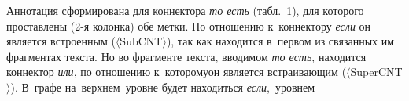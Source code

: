 \begin{multicols}{2}
Аннотация сформирована для коннектора \textit{то есть} (табл.~1), для которого 
проставлены (2-я колонка) обе метки. По отношению к~коннектору \textit{если} он 
является встроенным ($\langle$SubCNT$\rangle$), так как находится в~первом из 
связанных им фраг\-мен\-тах текс\-та. Но во фрагменте текс\-та, вводимом \textit{то 
есть}, находится коннектор \textit{или}, по отношению к~которому\linebreak он является 
встраивающим ($\langle$SuperCNT$\rangle$). В~графе на\, верх\-нем\, уровне будет 
находиться \textit{если},\,  уровнем %



\end{multicols}

\begin{figure*}[h] %
\vspace*{-6pt}
  \begin{center}  
    \mbox{%
\epsfxsize=163mm
}

\end{center}
\vspace*{-13pt}
\vspace*{4pt}
  \begin{center}  
    \mbox{%
\epsfxsize=163mm
}

\end{center}
\vspace*{-13pt}
\vspace*{-12pt}
\end{figure*}

